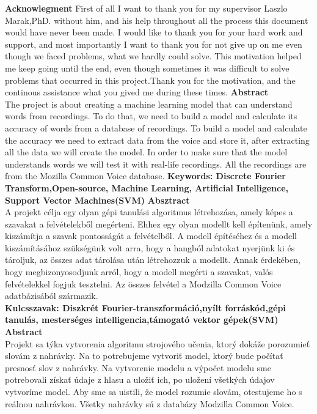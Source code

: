 \documentclass[english,12pt,oneside,a4paper]{article}
\begin{document}
	\textbf{Acknowlegment}
	\newline
	\newline
	First of all I want to thank you for my supervisor Laszlo Marak,PhD. without him, and his help throughout all the process this document would have never been made. I would like to thank you for your hard work and support, and most importantly I want to thank you for not give up on me even though we faced problems, what we hardly could solve. This motivation helped me keep going until the end, even though sometimes it was difficult to solve problems that occurred in this project.Thank you for the motivation, and the continous assistance what you gived me during these times.
	\newpage
	\textbf{Abstract}
	\\
	The project is about creating a machine learning model that can understand words from recordings. To do that, we need to build a model and calculate its accuracy of words from a database of recordings. To build a model and calculate the accuracy we need to extract data from the voice and store it, after extracting all the data we will create the model. In order to make sure that the model understands words we will test it with real-life recordings. All the recordings are from the Mozilla Common Voice database.
	\textbf{Keywords: Discrete Fourier Transform,Open-source, Machine Learning, Artificial Intelligence, Support Vector Machines(SVM)} 
	\newpage
	\textbf{Absztract}
	\\
	A projekt célja egy olyan gépi tanulási algoritmus létrehozása, amely képes a szavakat a felvételekből megérteni. Ehhez egy olyan modellt kell építenünk, amely kiszámítja a szavak pontosságát a felvételből. A modell építéséhez és a modell kiszámításához szükségünk volt arra, hogy a hangból adatokat nyerjünk ki és tároljuk, az összes adat tárolása után létrehozzuk a modellt. Annak érdekében, hogy megbizonyosodjunk arról, hogy a modell megérti a szavakat, valós felvételekkel fogjuk tesztelni. Az összes felvétel a Modzilla Common Voice adatbázisából származik.\\
	\textbf{Kulcsszavak: Diszkrét Fourier-transzformáció,nyílt forráskód,gépi tanulás, mesterséges intelligencia,támogató vektor gépek(SVM)} 
	\newpage
	\textbf{Abstract}
	\\
	Projekt sa týka vytvorenia algoritmu strojového učenia, ktorý dokáže porozumieť slovám z nahrávky. Na to potrebujeme vytvoriť model, ktorý bude počítať presnosť slov z nahrávky. Na vytvorenie modelu a výpočet modelu sme potrebovali získať údaje z hlasu a uložiť ich, po uložení všetkých údajov vytvoríme model. Aby sme sa uistili, že model rozumie slovám, otestujeme ho s reálnou nahrávkou. Všetky nahrávky sú z databázy Modzilla Common Voice.\\
\end{document}
